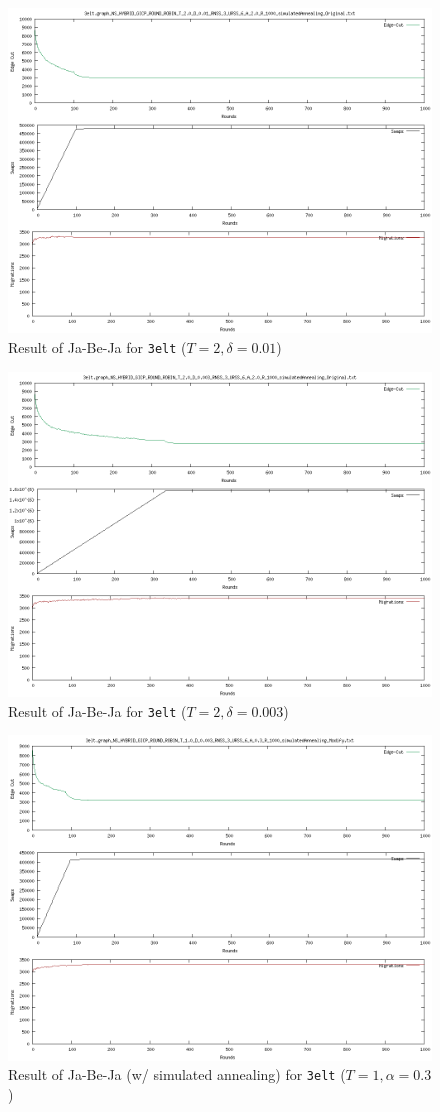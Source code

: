 \documentclass[]{article}
\begin{document}
\begin{figure}[!h]
    \centering
    \includegraphics[width=.5\textwidth]{../task2/3elt.graph_NS_HYBRID_GICP_ROUND_ROBIN_T_2.0_D_0.01_RNSS_3_URSS_6_A_2.0_R_1000_simulatedAnnealing_Original.txt.png}
    \caption{Result of Ja-Be-Ja for \texttt{3elt} ($T=2, \delta=0.01$)}
\end{figure}

\begin{figure}[!h]
    \centering
    \includegraphics[width=.5\textwidth]{../task2/3elt.graph_NS_HYBRID_GICP_ROUND_ROBIN_T_2.0_D_0.003_RNSS_3_URSS_6_A_2.0_R_1000_simulatedAnnealing_Original.txt.png}
    \caption{Result of Ja-Be-Ja for \texttt{3elt} ($T=2, \delta=0.003$)}
\end{figure}

\begin{figure}[!h]
    \centering
    \includegraphics[width=.5\textwidth]{../task2/3elt.graph_NS_HYBRID_GICP_ROUND_ROBIN_T_1.0_D_0.003_RNSS_3_URSS_6_A_0.3_R_1000_simulatedAnnealing_Modify.txt.png}
    \caption{Result of Ja-Be-Ja (w/ simulated annealing) for \texttt{3elt} ($T=1, \alpha=0.3$)}
\end{figure}
\end{document}
